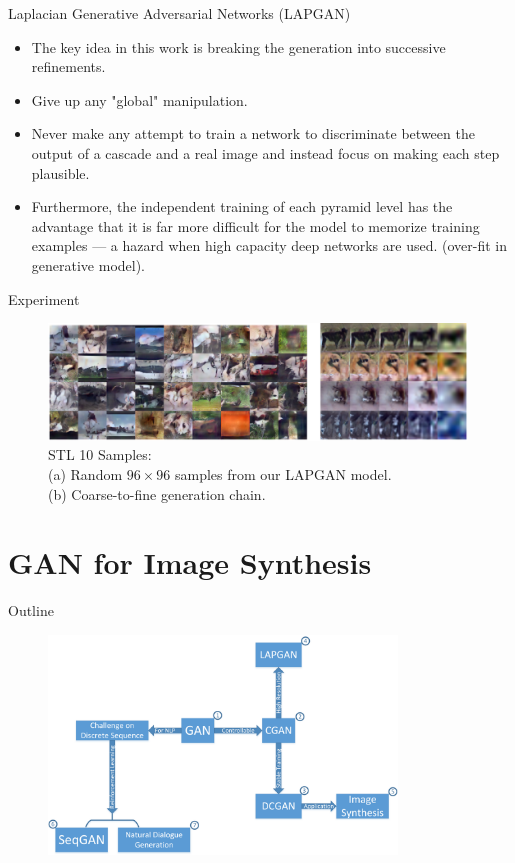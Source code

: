 \documentclass[10pt]{beamer}
\newcommand{\subtitlepage}[3]{\title{#1}\subtitle{#2}\author{#3}\date{}\begin{frame}[plain]\titlepage\end{frame}}
\begin{document}
	\begin{frame}{Laplacian Generative Adversarial Networks (LAPGAN)}
		\begin{itemize}
			\item The key idea in this work is breaking the generation into successive refinements.
			\item Give up any "global" manipulation.
			\item Never make any attempt to train a network to discriminate between the output of a cascade and a real image and instead focus on making each step plausible.
			\item Furthermore, the independent training of each pyramid level has the advantage that it is far more difficult for the model to memorize training examples --- a hazard when high capacity deep networks are used. (over-fit in generative model).
		\end{itemize}
	\end{frame}

	\begin{frame}{Experiment}
		\begin{figure}
			\includegraphics[width=30em]{figures/LAPGAN-experiment.png}
			\caption{STL 10 Samples: \\(a) Random $96\times96$ samples from our LAPGAN model. \\(b) Coarse-to-fine generation chain.}
		\end{figure}
	\end{frame}
	
	\part{GAN for Image Synthesis}
	\begin{frame}{Outline}
		\begin{figure}
			\includegraphics[width=25em]{figures/outline.png}
		\end{figure}
	\end{frame}
	\subtitlepage{}{Generative Adversarial Text to Image Synthesis}{Scott Reed, Zeynep Akata, Xinchen Yan, Lajanugen Logeswaran, Bernt Schiele, Honglak Lee\\ICML2016+JMLR Vol.48\\arXiv: 1605.05396}
	
\end{document}
